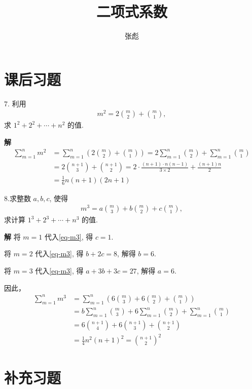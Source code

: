 \documentclass[a4paper,12pt]{ctexart}
\begin{document}
\title{二项式系数}
\author{张彪}
\maketitle

\tableofcontents



\section{课后习题}
7.  利用 \begin{align*}
	m^{2}=2\binom{m}{2}+\binom{m}{1},
\end{align*}
求 $1^{2}+2^{2}+\cdots+n^{2}$ 的值.

 \textbf{解} \quad
\begin{align*}
		\sum_{m=1}^{n} m^{2} &  =\sum_{m=1}^{n} \left( 2 \binom{m}{2}+\binom{m}{1}\right)
		=2 \sum_{m=1}^{n} \binom{m}{2}+\sum_{m=1}^{n} \binom{m}{1} \\[6pt]
		&=2\binom{n+1}{3}+\binom{n+1}{2}=2 \cdot \frac{(n+1) \cdot n(n-1)}{3 \times 2}+\frac{(n+1) n}{2} \\[6pt]
		& =\frac{1}{6} n(n+1)(2 n+1)
\end{align*}

8.求整数 $a, b, c$, 使得
\begin{align}\label{eq-m3}
	m^{3}=a\binom{m}{3}+ b \binom{m}{2}+ c \binom{m}{1},
\end{align}
求计算 $1^{3}+2^{3}+\cdots+n^{3}$ 的值.


 \textbf{解} \quad
将 $m=1$ 代入\eqref{eq-m3},  得 $c=1$.

将 $m=2$ 代入\eqref{eq-m3},  得 $b+2 c=8$, 解得 $b=6$.

 将 $m=3$ 代入\eqref{eq-m3},  得 $a+3 b+3 c=27$,  解得  $a=6$.

 因此，
\begin{align*}
	\sum_{m=1}^{n} m^{3} &=\sum_{m=1}^{n}\left(6\binom{m}{3}+ 6 \binom{m}{2}+  \binom{m}{1}\right) \\ &=b \sum_{m=1}^{n} \binom{m}{3} +6 \sum_{m=1}^{n}\binom{m}{2}+\sum_{m=1}^{n}\binom{m}{1}\\ &=6\binom{n+1}{4}+6\binom{n+1}{3}+\binom{n+1}{2}\\
	& =\frac{1}{4} n^{2}(n+1)^{2}=\binom{n+1}{2}^{2}
\end{align*}
\section{补充习题}
\end{document}
